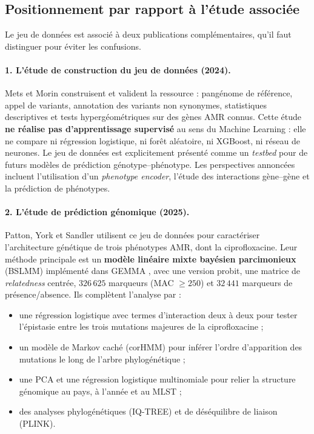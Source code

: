 \documentclass[11pt,a4paper]{article}
\begin{document}
\subsection{Positionnement par rapport à l'étude associée}

Le jeu de données est associé à deux publications complémentaires, qu'il faut distinguer pour éviter les confusions.

\paragraph{1. L'étude de construction du jeu de données (2024).}
Mets et Morin \citep{mets2024} construisent et valident la ressource : pangénome de référence, appel de variants, annotation des variants non synonymes, statistiques descriptives et tests hypergéométriques sur des gènes AMR connus. Cette étude \textbf{ne réalise pas d'apprentissage supervisé} au sens du Machine Learning : elle ne compare ni régression logistique, ni forêt aléatoire, ni XGBoost, ni réseau de neurones. Le jeu de données est explicitement présenté comme un \emph{testbed} pour de futurs modèles de prédiction génotype--phénotype. Les perspectives annoncées incluent l'utilisation d'un \emph{phenotype encoder}, l'étude des interactions gène--gène et la prédiction de phénotypes.

\paragraph{2. L'étude de prédiction génomique (2025).}
Patton, York et Sandler \citep{patton2025} utilisent ce jeu de données pour caractériser l'architecture génétique de trois phénotypes AMR, dont la ciprofloxacine. Leur méthode principale est un \textbf{modèle linéaire mixte bayésien parcimonieux} (BSLMM) implémenté dans GEMMA \citep{zhou2013}, avec une version probit, une matrice de \emph{relatedness} centrée, $326\,625$ marqueurs (MAC $\ge 250$) et $32\,441$ marqueurs de présence/absence. Ils complètent l'analyse par :
\begin{itemize}[leftmargin=1.2em]
    \item une régression logistique avec termes d'interaction deux à deux pour tester l'épistasie entre les trois mutations majeures de la ciprofloxacine ;
    \item un modèle de Markov caché (corHMM) pour inférer l'ordre d'apparition des mutations le long de l'arbre phylogénétique ;
    \item une PCA et une régression logistique multinomiale pour relier la structure génomique au pays, à l'année et au MLST ;
    \item des analyses phylogénétiques (IQ-TREE) et de déséquilibre de liaison (PLINK).
\end{itemize}
\end{document}
